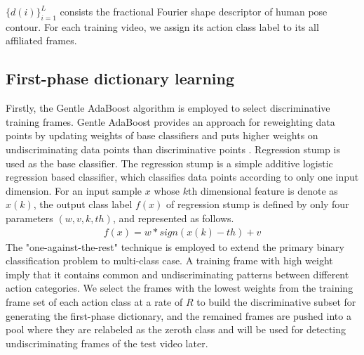 \documentclass{article}
\begin{document}
$\{d(i)\}_{i=1}^{L}$ consists the fractional Fourier shape descriptor of human pose contour.
For each training video, we assign its action class label to  its all affiliated frames.

\subsection{First-phase dictionary learning}
Firstly, the Gentle AdaBoost algorithm is  employed to select discriminative
training frames.
Gentle AdaBoost provides an  approach for reweighting data points by updating weights of base classifiers and  puts higher  weights on undiscriminating data points than  discriminative points \cite{Friedman98additivelogistic}.
Regression stump  is used as the base classifier. The regression stump is a simple additive logistic regression based classifier, which classifies data points according to only one input dimension. For an input sample $x$ whose $k$th dimensional feature is denote as $x(k)$, the output class label $f(x)$  of regression stump is defined by only four parameters $(w,v,k,th)$, and represented as follows.
\begin{equation} \label{eq5}
 \begin{aligned}
  f(x) = w*sign(x(k)-th)+v
 \end{aligned}
\end{equation}
The "one-against-the-rest" technique is employed to extend the primary binary
classification problem to multi-class case.
A training frame  with high weight imply that it contains common and undiscriminating patterns between different action categories.
We select the frames with the lowest weights from  the training frame set of each action class at a rate of $R$ to build the discriminative subset for generating the first-phase dictionary, and the remained frames are pushed into a pool where they are relabeled as the zeroth class and will be used for detecting
undiscriminating frames of the test video later.
\end{document}
